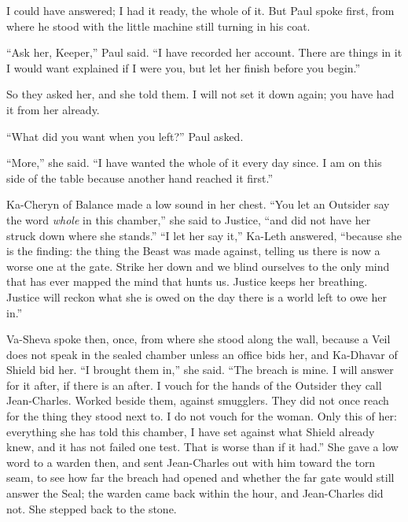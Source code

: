 I could have answered; I had it ready, the whole of it. But Paul spoke first, from where he stood with the little machine still turning in his coat.\par

``Ask her, Keeper,'' Paul said. ``I have recorded her account. There are things in it I would want explained if I were you, but let her finish before you begin.''\par

So they asked her, and she told them. I will not set it down again; you have had it from her already.\par

``What did you want when you left?'' Paul asked.\par

``More,'' she said. ``I have wanted the whole of it every day since. I am on this side of the table because another hand reached it first.''\par

Ka-Cheryn of Balance made a low sound in her chest. ``You let an Outsider say the word \emph{whole} in this chamber,'' she said to Justice, ``and did not have her struck down where she stands.'' ``I let her say it,'' Ka-Leth answered, ``because she is the finding: the thing the Beast was made against, telling us there is now a worse one at the gate. Strike her down and we blind ourselves to the only mind that has ever mapped the mind that hunts us. Justice keeps her breathing. Justice will reckon what she is owed on the day there is a world left to owe her in.''\par

Va-Sheva spoke then, once, from where she stood along the wall, because a Veil does not speak in the sealed chamber unless an office bids her, and Ka-Dhavar of Shield bid her. ``I brought them in,'' she said. ``The breach is mine. I will answer for it after, if there is an after. I vouch for the hands of the Outsider they call Jean-Charles. Worked beside them, against smugglers. They did not once reach for the thing they stood next to. I do not vouch for the woman. Only this of her: everything she has told this chamber, I have set against what Shield already knew, and it has not failed one test. That is worse than if it had.'' She gave a low word to a warden then, and sent Jean-Charles out with him toward the torn seam, to see how far the breach had opened and whether the far gate would still answer the Seal; the warden came back within the hour, and Jean-Charles did not. She stepped back to the stone.\par

